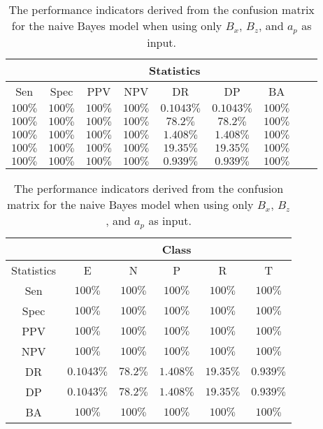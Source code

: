 \begin{table}[!ht]
	\centering
	\begin{tabular}{|c|c|c|c|c|c|c|c|c|}
		\hline
		 & \multicolumn{7}{c|}{Statistics} \\ \hline
		Sen & Spec & PPV & NPV & DR & DP & BA \\ \hline
		$100\%$ & $100\%$ & $100\%$ & $100\%$ & $0.1043\%$ & $0.1043\%$ & $100\%$ \\ \hline
		$100\%$ & $100\%$ & $100\%$ & $100\%$ & $78.2\%$ & $78.2\%$ & $100\%$ \\ \hline
		$100\%$ & $100\%$ & $100\%$ & $100\%$ & $1.408\%$ & $1.408\%$ & $100\%$ \\ \hline
		$100\%$ & $100\%$ & $100\%$ & $100\%$ & $19.35\%$ & $19.35\%$ & $100\%$ \\ \hline
		$100\%$ & $100\%$ & $100\%$ & $100\%$ & $0.939\%$ & $0.939\%$ & $100\%$ \\ \hline
	\end{tabular}
	\caption{The performance indicators derived from the confusion matrix for the naive Bayes model when using only $B_{x}$, $B_{z}$, and $a_{p}$ as input.}
	\label{tab:cs:xzap:nb}
\end{table}

\begin{table}[!ht]
	\centering
	\begin{tabular}{|c|c|c|c|c|c|}
		\hline
		 & \multicolumn{5}{c|}{Class} \\ \hline
		Statistics & E & N & P & R & T \\ \hline
		Sen & $100\%$ & $100\%$ & $100\%$ & $100\%$ & $100\%$ \\ \hline
		Spec & $100\%$ & $100\%$ & $100\%$ & $100\%$ & $100\%$ \\ \hline
		PPV & $100\%$ & $100\%$ & $100\%$ & $100\%$ & $100\%$ \\ \hline
		NPV & $100\%$ & $100\%$ & $100\%$ & $100\%$ & $100\%$ \\ \hline
		DR & $0.1043\%$ & $78.2\%$ & $1.408\%$ & $19.35\%$ & $0.939\%$ \\ \hline
		DP & $0.1043\%$ & $78.2\%$ & $1.408\%$ & $19.35\%$ & $0.939\%$ \\ \hline
		BA & $100\%$ & $100\%$ & $100\%$ & $100\%$ & $100\%$ \\ \hline
	\end{tabular}
	\caption{The performance indicators derived from the confusion matrix for the naive Bayes model when using only $B_{x}$, $B_{z}$, and $a_{p}$ as input.}
	\label{tab:cs:reverse:xzap:nb}
\end{table}

